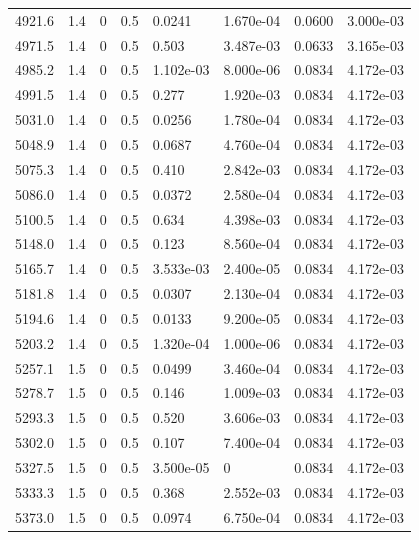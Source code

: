 \documentclass[preview]{standalone}
\begin{document}
{{{{{\begin{tabular}{L{1.2cm}C{1.2cm} C{0.3cm}C{0.5cm} C{1.4cm}C{1.4cm} C{1.4cm}C{1.4cm}}
  4921.6  &   1.4  & 0     & 0.5 &  0.0241  & 1.670e-04  & 0.0600 &  3.000e-03   \\ 
  4971.5  &   1.4  & 0     & 0.5 &  0.503  & 3.487e-03  & 0.0633 &  3.165e-03   \\ 
  4985.2  &   1.4  & 0     & 0.5 &  1.102e-03  & 8.000e-06  & 0.0834 &  4.172e-03   \\ 
  4991.5  &   1.4  & 0     & 0.5 &  0.277  & 1.920e-03  & 0.0834 &  4.172e-03   \\ 
  5031.0  &   1.4  & 0     & 0.5 &  0.0256  & 1.780e-04  & 0.0834 &  4.172e-03   \\ 
  5048.9  &   1.4  & 0     & 0.5 &  0.0687  & 4.760e-04  & 0.0834 &  4.172e-03   \\ 
  5075.3  &   1.4  & 0     & 0.5 &  0.410  & 2.842e-03  & 0.0834 &  4.172e-03   \\ 
  5086.0  &   1.4  & 0     & 0.5 &  0.0372  & 2.580e-04  & 0.0834 &  4.172e-03   \\ 
  5100.5  &   1.4  & 0     & 0.5 &  0.634  & 4.398e-03  & 0.0834 &  4.172e-03   \\ 
  5148.0  &   1.4  & 0     & 0.5 &  0.123  & 8.560e-04  & 0.0834 &  4.172e-03   \\ 
  5165.7  &   1.4  & 0     & 0.5 &  3.533e-03  & 2.400e-05  & 0.0834 &  4.172e-03   \\ 
  5181.8  &   1.4  & 0     & 0.5 &  0.0307  & 2.130e-04  & 0.0834 &  4.172e-03   \\ 
  5194.6  &   1.4  & 0     & 0.5 &  0.0133  & 9.200e-05  & 0.0834 &  4.172e-03   \\ 
  5203.2  &   1.4  & 0     & 0.5 &  1.320e-04  & 1.000e-06  & 0.0834 &  4.172e-03   \\ 
  5257.1  &   1.5  & 0     & 0.5 &  0.0499  & 3.460e-04  & 0.0834 &  4.172e-03   \\ 
  5278.7  &   1.5  & 0     & 0.5 &  0.146  & 1.009e-03  & 0.0834 &  4.172e-03   \\ 
  5293.3  &   1.5  & 0     & 0.5 &  0.520  & 3.606e-03  & 0.0834 &  4.172e-03   \\ 
  5302.0  &   1.5  & 0     & 0.5 &  0.107  & 7.400e-04  & 0.0834 &  4.172e-03   \\ 
  5327.5  &   1.5  & 0     & 0.5 &  3.500e-05  & 0  & 0.0834 &  4.172e-03   \\ 
  5333.3  &   1.5  & 0     & 0.5 &  0.368  & 2.552e-03  & 0.0834 &  4.172e-03   \\ 
  5373.0  &   1.5  & 0     & 0.5 &  0.0974  & 6.750e-04  & 0.0834 &  4.172e-03   \\ 

\end{tabular}}}}}}
\end{document}
